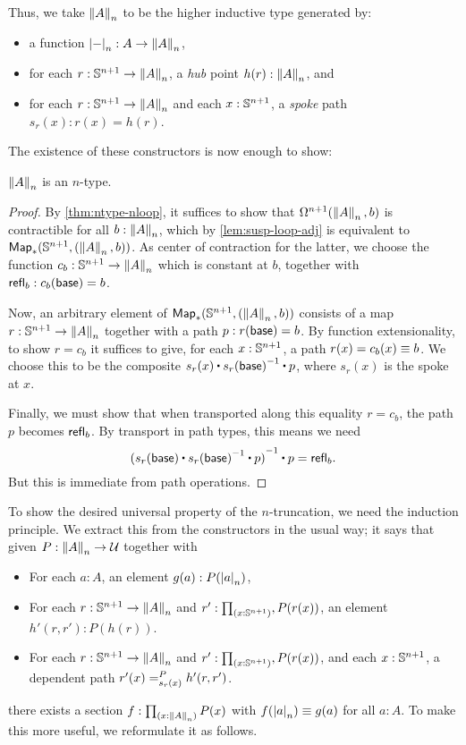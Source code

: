 Thus, we take $\trunc nA$ to be the higher inductive type generated by:
\begin{itemize}
\item a function $\tproj n- : A \to \trunc n A$,
\item for each $r:\Sn^{n+1} \to \trunc n A$, a \emph{hub} point $h(r):\trunc n A$, and
\item for each $r:\Sn^{n+1} \to \trunc n A$ and each $x:\Sn^{n+1}$, a \emph{spoke} path $s_r(x):r(x) = h(r)$.
\end{itemize}

\noindent
The existence of these constructors is now enough to show:

\begin{lem}
  $\trunc n A$ is an $n$-type.
\end{lem}
\begin{proof}
  By \autoref{thm:ntype-nloop}, it suffices to show that $\Omega ^{n+1}(\trunc nA,b)$ is contractible for all $b:\trunc nA$, which by
\autoref{lem:susp-loop-adj} is equivalent to $\Map_*(\Sn^{n+1},(\trunc nA,b))$.
  As center of contraction for the latter, we choose the function $c_b:\Sn^{n+1} \to \trunc nA$ which is constant at $b$, together with
$\refl b : c_b(\base) = b$.

  Now, an arbitrary element of $\Map_*(\Sn^{n+1},(\trunc nA,b))$ consists of a map $r:\Sn^{n+1} \to \trunc n A$ together with a path
$p:r(\base)=b$.
  By function extensionality, to show $r = c_b$ it suffices to give, for each $x:\Sn^{n+1}$, a path $r(x)=c_b(x) \jdeq b$.
  We choose this to be the composite $s_r(x) \ct \opp{s_r(\base)} \ct p$, where $s_r(x)$ is the spoke at $x$.


  Finally, we must show that when transported along this equality $r=c_b$, the path $p$ becomes $\refl b$.
  By transport in path types, this means we need
  \[\opp{(s_r(\base) \ct \opp{s_r(\base)} \ct p)} \ct p = \refl b.\]
  But this is immediate from path operations.
\end{proof}

To show the desired universal property of the $n$-truncation, we need the induction principle.
We extract this from the constructors in the usual way; it says that given $P:\trunc nA\to\type$ together with
\begin{itemize}
\item For each $a:A$, an element $g(a) : P(\tproj na)$,
\item For each $r:\Sn^{n+1} \to \trunc n A$ and $r':\prd{x:\Sn^{n+1}}, P(r(x))$, an element $h'(r,r'):P(h(r))$.
\item For each $r:\Sn^{n+1} \to \trunc n A$ and $r':\prd{x:\Sn^{n+1}}, P(r(x))$, and each $x:\Sn^{n+1}$, a dependent path
$\dpath{P}{s_r(x)}{r'(x)}{h'(r,r')}$.
\end{itemize}
there exists a section $f:\prd{x:\trunc n A} P(x)$ with $f(\tproj n a) \jdeq g(a)$ for all $a:A$.
To make this more useful, we reformulate it as follows.


